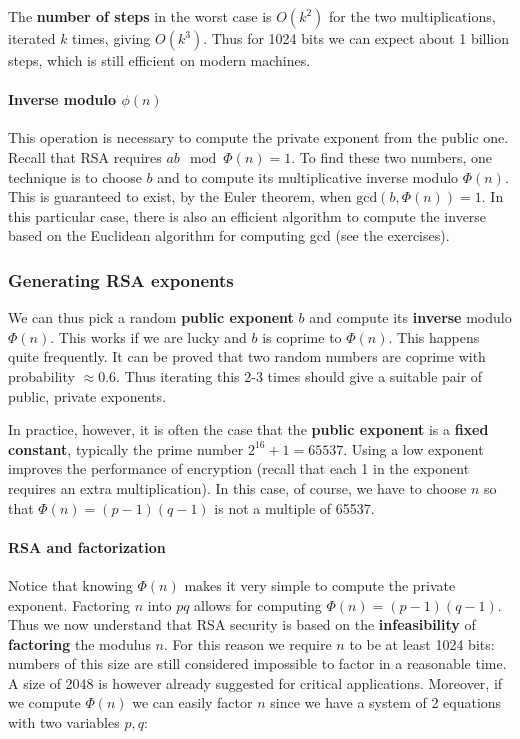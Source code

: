 The \textbf{number of steps} in the worst case is $O(k^2)$ for the two multiplications, iterated $k$ times, giving $O(k^3)$. Thus for 1024 bits we can expect about 1 billion steps, which is still efficient on modern machines.

\paragraph{Inverse modulo $\phi(n)$}
This operation is necessary to compute the private exponent from the public one. Recall that RSA requires $ab \mod \Phi(n) = 1$. To find these two numbers, one technique is to choose $b$ and to compute its multiplicative inverse modulo $\Phi(n)$. This is guaranteed to exist, by the Euler theorem, when $\text{gcd}(b,\Phi(n))=1$. In this particular case, there is also an efficient algorithm to compute the inverse based on the Euclidean algorithm for computing gcd (see the exercises).

\subsubsection{Generating RSA exponents}
We can thus pick a random \textbf{public exponent} $b$ and compute its \textbf{inverse} modulo $\Phi(n)$. This works if we are lucky and $b$ is coprime to $\Phi(n)$. This happens quite frequently. It can be proved that two random numbers are coprime with probability $\approx 0.6$. Thus iterating this 2-3 times should give a suitable pair of public, private exponents.

In practice, however, it is often the case that the \textbf{public exponent} is a \textbf{fixed constant}, typically the prime number $2^{16} +1 = 65537$. Using a low exponent improves the performance of encryption (recall that each 1 in the exponent requires an extra multiplication). In this case, of course, we have to choose $n$ so that $\Phi(n) = (p-1)(q-1)$ is not a multiple of 65537.

\paragraph{RSA and factorization}
Notice that knowing $\Phi(n)$ makes it very simple to compute the private exponent. Factoring $n$ into $pq$ allows for computing $\Phi(n) = (p-1)(q-1)$. Thus we now understand that RSA security is based on the \textbf{infeasibility} of \textbf{factoring} the modulus $n$. For this reason we require $n$ to be at least 1024 bits: numbers of this size are still considered impossible to factor in a reasonable time. A size of 2048 is however already suggested for critical applications. Moreover, if we compute $\Phi(n)$ we can easily factor $n$ since we have a system of 2 equations with two variables $p,q$:

